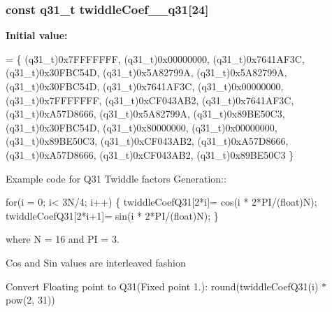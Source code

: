 \subsubsection[{\texorpdfstring{twiddle\+Coef\+\_\+16\+\_\+q31}{twiddleCoef_16_q31}}]{\setlength{\rightskip}{0pt plus 5cm}const q31\+\_\+t twiddle\+Coef\+\_\+\_\+q31\mbox{[}24\mbox{]}}\hypertarget{group__CFFT__CIFFT_gaef4697e1ba348c4ac9358f2b9e279e93}{}\label{group__CFFT__CIFFT_gaef4697e1ba348c4ac9358f2b9e279e93}
{\bfseries Initial value\+:}
\begin{DoxyCode}
= \{
    (q31\_t)0x7FFFFFFF, (q31\_t)0x00000000,
    (q31\_t)0x7641AF3C, (q31\_t)0x30FBC54D,
    (q31\_t)0x5A82799A, (q31\_t)0x5A82799A,
    (q31\_t)0x30FBC54D, (q31\_t)0x7641AF3C,
    (q31\_t)0x00000000, (q31\_t)0x7FFFFFFF,
    (q31\_t)0xCF043AB2, (q31\_t)0x7641AF3C,
    (q31\_t)0xA57D8666, (q31\_t)0x5A82799A,
    (q31\_t)0x89BE50C3, (q31\_t)0x30FBC54D,
    (q31\_t)0x80000000, (q31\_t)0x00000000,
    (q31\_t)0x89BE50C3, (q31\_t)0xCF043AB2,
    (q31\_t)0xA57D8666, (q31\_t)0xA57D8666,
    (q31\_t)0xCF043AB2, (q31\_t)0x89BE50C3
\}
\end{DoxyCode}
\begin{DoxyParagraph}{}
Example code for Q31 Twiddle factors Generation\+:\+: 
\end{DoxyParagraph}
\begin{DoxyParagraph}{}

\begin{DoxyPre}for(i = 0; i< 3N/4; i++)
\{
   twiddleCoefQ31[2*i]= cos(i * 2*PI/(float)N);
   twiddleCoefQ31[2*i+1]= sin(i * 2*PI/(float)N);
\} \end{DoxyPre}
 
\end{DoxyParagraph}
\begin{DoxyParagraph}{}
where N = 16 and PI = 3. 
\end{DoxyParagraph}
\begin{DoxyParagraph}{}
Cos and Sin values are interleaved fashion 
\end{DoxyParagraph}
\begin{DoxyParagraph}{}
Convert Floating point to Q31(Fixed point 1.)\+: round(twiddle\+Coef\+Q31(i) $\ast$ pow(2, 31)) 
\end{DoxyParagraph}
